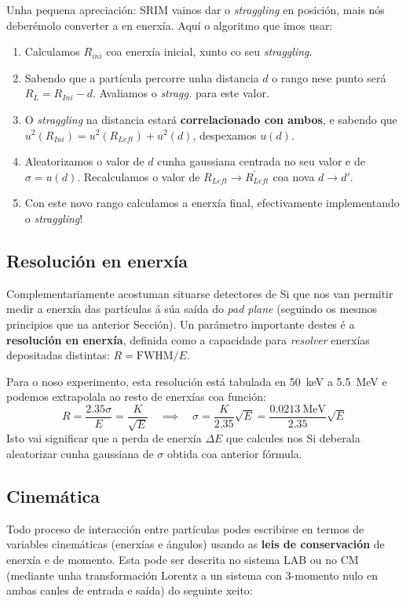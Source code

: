 \documentclass[11pt, a4paper]{article}
\begin{document}
Unha pequena apreciación: SRIM vainos dar o \textit{straggling} en posición, mais nós deberémolo converter a en enerxía. Aquí o algoritmo que imos usar:
\begin{enumerate}
    \item Calculamos $R_{ini}$ coa enerxía inicial, xunto co seu \textit{straggling}.
    \item Sabendo que a partícula percorre unha distancia $d$ o rango nese punto será $R_{L} = R_{Ini} - d$. Avaliamos o \textit{stragg.} para este valor.
    \item O \textit{straggling} na distancia estará \textbf{correlacionado con ambos}, e sabendo que $u^2(R_{Ini}) = u^2(R_{Left}) + u^2(d)$, despexamos $u(d)$.
    \item Aleatorizamos o valor de $d$ cunha gaussiana centrada no seu valor e de $\sigma = u(d)$. Recalculamos o valor de $R_{Left} \longrightarrow R_{Left}^{\prime}$ coa nova $d \longrightarrow d\prime$.
    \item Con este novo rango calculamos a enerxía final, efectivamente implementando o \textit{straggling}!
\end{enumerate}

\subsection{Resolución en enerxía}
Complementariamente acostuman situarse detectores de Si que nos van permitir medir a enerxía das partículas á súa saída do \textit{pad plane} (seguindo os mesmos principios que na anterior Sección). Un parámetro importante destes é a \textbf{resolución en enerxía}, definida como a capacidade para \textit{resolver} enerxías depositadas distintas: $R = \textrm{FWHM} / E$.

Para o noso experimento, esta resolución está tabulada en \qty{50}{\keV} a \qty{5.5}{\MeV} e podemos extrapolala ao resto de enerxías coa función:
\begin{equation*}
    R = \frac{2.35 \sigma}{E} = \frac{K}{\sqrt{E}} \quad \implies \quad \sigma = \frac{K}{2.35}\sqrt{E} = \frac{\qty{0.0213}{\MeV}}{2.35} \sqrt{E}
\end{equation*}
Isto vai significar que a perda de enerxía $\Delta E$ que calcules nos Si deberala aleatorizar cunha gaussiana de $\sigma$ obtida coa anterior fórmula.

\subsection{Cinemática}
Todo proceso de interacción entre partículas podes escribirse en termos de variables cinemáticas (enerxías e ángulos) usando as \textbf{leis de conservación} de enerxía e de momento. Esta pode ser descrita no sistema LAB ou no CM (mediante unha transformación Lorentz a un sistema con 3-momento nulo en ambas canles de entrada e saída) do seguinte xeito:
\end{document}
